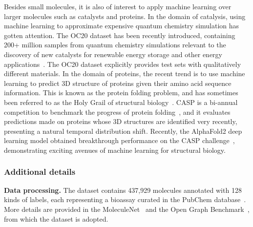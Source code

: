 Besides small molecules, it is also of interest to apply machine learning over larger molecules such as catalysts and proteins.
In the domain of catalysis, using machine learning to approximate expensive quantum chemistry simulation has gotten attention. The OC20 dataset has been recently introduced, containing 200+ million samples from quantum chemistry simulations relevant to the discovery of new catalysts for renewable energy storage and other energy applications~\citep{becke2014perspective,chanussot2020open,zitnick2020introduction}. The OC20 dataset explicitly provides test sets with qualitatively different materials.
In the domain of proteins, the recent trend is to use machine learning to predict 3D structure of proteins given their amino acid sequence information. This is known as the protein folding problem, and has sometimes been referred to as the Holy Grail of structural biology~\citep{dill2012protein}.
CASP is a bi-annual competition to benchmark the progress of protein folding~\citep{moult1995large}, and it evaluates predictions made on proteins whose 3D structures are identified very recently, presenting a natural temporal distribution shift.
Recently, the AlphaFold2 deep learning model obtained breakthrough performance on the CASP challenge~\citep{jumper2020alphafold}, demonstrating exciting avenues of machine learning for structural biology.


\subsubsection{Additional details}\label{sec:app_molpcba_details}
\textbf{Data processing.}
The \Mol dataset contains 437,929 molecules annotated with 128 kinds of labels, each representing a bioassay curated in the PubChem database~\citep{kim2016pubchem}. More details are provided in the MoleculeNet~\citep{wu2018moleculenet} and the Open Graph Benchmark~\citep{hu2020open}, from which the dataset is adopted.
